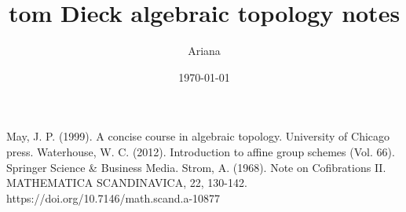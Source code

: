 \documentclass[12pt]{article}
\title{tom Dieck algebraic topology notes}
\date{\today}
\author{Ariana}
\begin{document}






\begin{thebibliography}{99}
     May, J. P. (1999). A concise course in algebraic topology. University of Chicago press.
     Waterhouse, W. C. (2012). Introduction to affine group schemes (Vol. 66). Springer Science \& Business Media.
     Strom, A. (1968). Note on Cofibrations II. MATHEMATICA SCANDINAVICA, 22, 130-142. https://doi.org/10.7146/math.scand.a-10877
\end{thebibliography}
\end{document}
